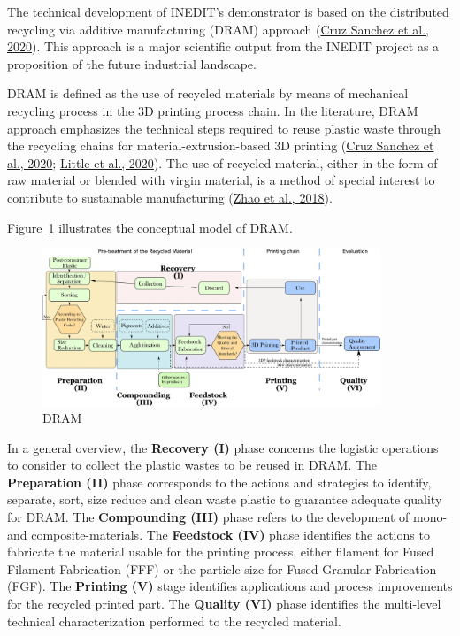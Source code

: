 \documentclass[
  11pt,
]{article}
\begin{document}
The technical development of INEDIT's demonstrator is based on the
distributed recycling via additive manufacturing (DRAM) approach
(\protect\hyperlink{ref-CruzSanchez2020}{Cruz Sanchez et al., 2020}).
This approach is a major scientific output from the INEDIT project as a
proposition of the future industrial landscape.

DRAM is defined as the use of recycled materials by means of mechanical
recycling process in the 3D printing process chain. In the literature,
DRAM approach emphasizes the technical steps required to reuse plastic
waste through the recycling chains for material-extrusion-based 3D
printing (\protect\hyperlink{ref-CruzSanchez2020}{Cruz Sanchez et al.,
2020}; \protect\hyperlink{ref-Little2020}{Little et al., 2020}). The use
of recycled material, either in the form of raw material or blended with
virgin material, is a method of special interest to contribute to
sustainable manufacturing (\protect\hyperlink{ref-Zhao2018}{Zhao et al.,
2018}).

Figure~\ref{fig-dram} illustrates the conceptual model of DRAM.

\begin{figure}

{\centering \includegraphics[width=0.9\textwidth,height=\textheight]{figures/DRAM-10.png}

}

\caption{\label{fig-dram}DRAM}

\end{figure}

In a general overview, the \textbf{Recovery (I)} phase concerns the
logistic operations to consider to collect the plastic wastes to be
reused in DRAM. The \textbf{Preparation (II)} phase corresponds to the
actions and strategies to identify, separate, sort, size reduce and
clean waste plastic to guarantee adequate quality for DRAM. The
\textbf{Compounding (III)} phase refers to the development of mono- and
composite-materials. The \textbf{Feedstock (IV)} phase identifies the
actions to fabricate the material usable for the printing process,
either filament for Fused Filament Fabrication (FFF) or the particle
size for Fused Granular Fabrication (FGF). The \textbf{Printing (V)}
stage identifies applications and process improvements for the recycled
printed part. The \textbf{Quality (VI)} phase identifies the multi-level
technical characterization performed to the recycled material.
\end{document}
